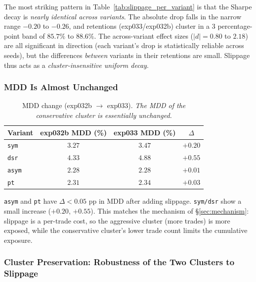 \documentclass[11pt, a4paper]{article}
\begin{document}
The most striking pattern in Table~\ref{tab:slippage_per_variant} is that the
Sharpe decay is \emph{nearly identical across variants}. The absolute drop
falls in the narrow range $-0.20$ to $-0.26$, and retentions
(exp033/exp032b) cluster in a 3 percentage-point band of $85.7\%$ to
$88.6\%$. The across-variant effect sizes ($|d| = 0.80$ to $2.18$) are all
significant in direction (each variant's drop is statistically reliable
across seeds), but the differences \emph{between} variants in their
retentions are small. Slippage thus acts as a \emph{cluster-insensitive
uniform decay}.

\subsubsection{MDD Is Almost Unchanged}
\label{sec:slippage_mdd}

\begin{table}[!htbp]
\centering
\caption{MDD change (exp032b $\to$ exp033). \textit{The MDD of the
conservative cluster is essentially unchanged.}}
\begin{tabular}{lccc}
\toprule
Variant & exp032b MDD (\%) & exp033 MDD (\%) & $\Delta$ \\
\midrule
\texttt{sym}  & $3.27$ & $3.47$ & $+0.20$ \\
\texttt{dsr}  & $4.33$ & $4.88$ & $+0.55$ \\
\texttt{asym} & $2.28$ & $2.28$ & $+0.01$ \\
\texttt{pt}   & $2.31$ & $2.34$ & $+0.03$ \\
\bottomrule
\end{tabular}
\label{tab:slippage_mdd}
\end{table}

\texttt{asym} and \texttt{pt} have $\Delta < 0.05$ pp in MDD after adding
slippage. \texttt{sym/dsr} show a small increase ($+0.20$, $+0.55$). This
matches the mechanism of \S\ref{sec:mechanism}: slippage is a per-trade cost,
so the aggressive cluster (more trades) is more exposed, while the
conservative cluster's lower trade count limits the cumulative exposure.

\subsubsection{Cluster Preservation: Robustness of the Two Clusters to Slippage}
\label{sec:slippage_cluster}
\end{document}
